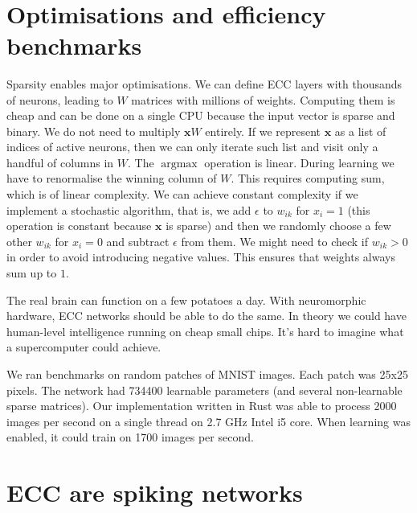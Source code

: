 \documentclass[12pt]{article}
\DeclareMathOperator*{\argmax}{argmax}
\begin{document}
\


\section{Optimisations and efficiency benchmarks}

Sparsity enables major optimisations. We can define ECC layers with thousands of neurons, leading to $W$ matrices with millions of weights. Computing them is cheap and can be done on a single CPU because the input vector is sparse and binary. We do not need to multiply $\boldsymbol{x}W$ entirely. If we represent $\boldsymbol{x}$ as a list of indices of active neurons, then we can only iterate such list and visit only a handful of columns in $W$. The $\argmax$ operation is linear. During learning we have to renormalise the winning column of $W$. This requires computing sum, which is of linear complexity. We can achieve constant complexity if we implement a stochastic algorithm, that is, we add $\epsilon$ to $w_{ik}$ for $x_i=1$ (this operation is constant because $\boldsymbol{x}$ is sparse) and then we randomly choose a few other $w_{ik}$ for $x_i=0$ and subtract $\epsilon$ from them. We might need to check if $w_{ik}>0$ in order to avoid introducing negative values. This ensures that weights always sum up to $1$.

The real brain can function on a few potatoes a day. With neuromorphic hardware, ECC networks should be able to do the same. In theory we could have human-level intelligence running on cheap small chips. It's hard to imagine what a supercomputer could achieve.

We ran benchmarks on random patches of MNIST images. Each patch was 25x25 pixels. The network had 734400 learnable parameters (and several non-learnable sparse matrices). Our implementation written in Rust was able to process 2000 images per second on a single thread on 2.7 GHz Intel i5 core. When learning was enabled, it could train on 1700 images per second.


\section{ECC are spiking networks}
\end{document}

